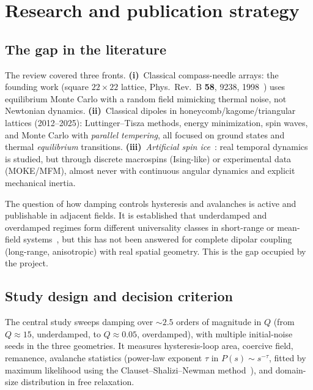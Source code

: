 \documentclass[11pt,a4paper]{article}
\begin{document}
\section{Research and publication strategy}
\label{sec:pesquisa}

\subsection{The gap in the literature}

The review covered three fronts. \textbf{(i)}~Classical compass-needle arrays: the founding work (square $22\times22$ lattice, Phys.\ Rev.\ B \textbf{58}, 9238, 1998~\cite{prb1998}) uses equilibrium Monte Carlo with a random field mimicking thermal noise, not Newtonian dynamics. \textbf{(ii)}~Classical dipoles in honeycomb/kagome/triangular lattices (2012--2025): Luttinger--Tisza methods, energy minimization, spin waves, and Monte Carlo with \emph{parallel tempering}, all focused on ground states and thermal \emph{equilibrium} transitions. \textbf{(iii)}~\emph{Artificial spin ice}~\cite{nisoli2013}: real temporal dynamics is studied, but through discrete macrospins (Ising-like) or experimental data (MOKE/MFM), almost never with continuous angular dynamics and explicit mechanical inertia.

The question of how damping controls hysteresis and avalanches is active and publishable in adjacent fields. It is established that underdamped and overdamped regimes form different universality classes in short-range or mean-field systems~\cite{dahmen2011}, but this has not been answered for complete dipolar coupling (long-range, anisotropic) with real spatial geometry. This is the gap occupied by the project.

\subsection{Study design and decision criterion}

The central study sweeps damping over $\sim 2.5$ orders of magnitude in $Q$ (from $Q \approx 15$, underdamped, to $Q \approx 0.05$, overdamped), with multiple initial-noise seeds in the three geometries. It measures hysteresis-loop area, coercive field, remanence, avalanche statistics (power-law exponent $\tau$ in $P(s) \sim s^{-\tau}$, fitted by maximum likelihood using the Clauset--Shalizi--Newman method~\cite{clauset2009}), and domain-size distribution in free relaxation.
\end{document}
